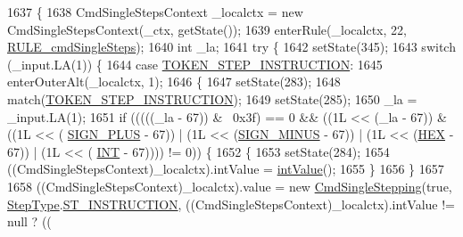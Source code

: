 \begin{DoxyCode}
1637                                                                                   \{
1638     CmdSingleStepsContext \_localctx = \textcolor{keyword}{new} CmdSingleStepsContext(\_ctx, getState());
1639     enterRule(\_localctx, 22, \hyperlink{classgov_1_1nasa_1_1jpf_1_1inspector_1_1client_1_1parser_1_1_console_grammar_parser_a6c48a7ddf131fb88e1750b2c41f97f78}{RULE\_cmdSingleSteps});
1640     \textcolor{keywordtype}{int} \_la;
1641     \textcolor{keywordflow}{try} \{
1642       setState(345);
1643       \textcolor{keywordflow}{switch} (\_input.LA(1)) \{
1644       \textcolor{keywordflow}{case} \hyperlink{classgov_1_1nasa_1_1jpf_1_1inspector_1_1client_1_1parser_1_1_console_grammar_parser_a5d7386e4567131525835f75805a6de54}{TOKEN\_STEP\_INSTRUCTION}:
1645         enterOuterAlt(\_localctx, 1);
1646         \{
1647         setState(283);
1648         match(\hyperlink{classgov_1_1nasa_1_1jpf_1_1inspector_1_1client_1_1parser_1_1_console_grammar_parser_a5d7386e4567131525835f75805a6de54}{TOKEN\_STEP\_INSTRUCTION});
1649         setState(285);
1650         \_la = \_input.LA(1);
1651         \textcolor{keywordflow}{if} (((((\_la - 67)) & ~0x3f) == 0 && ((1L << (\_la - 67)) & ((1L << (
      \hyperlink{classgov_1_1nasa_1_1jpf_1_1inspector_1_1client_1_1parser_1_1_console_grammar_parser_ac2a6ae73b3b6ce7feef07c1b4866af05}{SIGN\_PLUS} - 67)) | (1L << (\hyperlink{classgov_1_1nasa_1_1jpf_1_1inspector_1_1client_1_1parser_1_1_console_grammar_parser_a48b3f6921fee5d663dafe240074dac66}{SIGN\_MINUS} - 67)) | (1L << (\hyperlink{classgov_1_1nasa_1_1jpf_1_1inspector_1_1client_1_1parser_1_1_console_grammar_parser_a760e1cd3b643e8ee8af5d134b5d438c6}{HEX} - 67)) | (1L << (
      \hyperlink{classgov_1_1nasa_1_1jpf_1_1inspector_1_1client_1_1parser_1_1_console_grammar_parser_abd77a1befc3eca91ef4ffb5856126df5}{INT} - 67)))) != 0)) \{
1652           \{
1653           setState(284);
1654           ((CmdSingleStepsContext)\_localctx).intValue = \hyperlink{classgov_1_1nasa_1_1jpf_1_1inspector_1_1client_1_1parser_1_1_console_grammar_parser_a132b5d5236398d90d8d1e6b16dc0bd20}{intValue}();
1655           \}
1656         \}
1657 
1658          ((CmdSingleStepsContext)\_localctx).value =  \textcolor{keyword}{new} \hyperlink{classgov_1_1nasa_1_1jpf_1_1inspector_1_1client_1_1commands_1_1_cmd_single_stepping}{CmdSingleStepping}(\textcolor{keyword}{true}, 
      \hyperlink{enumgov_1_1nasa_1_1jpf_1_1inspector_1_1interfaces_1_1_commands_interface_1_1_step_type}{StepType}.\hyperlink{enumgov_1_1nasa_1_1jpf_1_1inspector_1_1interfaces_1_1_commands_interface_1_1_step_type_a6c3b00b14cb19949d53de12f80d36404}{ST\_INSTRUCTION},   ((CmdSingleStepsContext)\_localctx).intValue != null ? ((

\end{DoxyCode}
